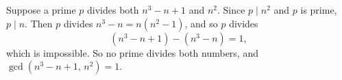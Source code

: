 Suppose a prime $p$ divides both $n^3-n+1$ and $n^2$. Since $p\mid n^2$ and $p$ is prime, $p\mid n$. Then $p$ divides $n^3-n=n(n^2-1)$, and so $p$ divides
\[
\left(n^3-n+1\right)-\left(n^3-n\right)=1,
\]
which is impossible. So no prime divides both numbers, and $\gcd\left(n^3-n+1,\,n^2\right)=1$.
